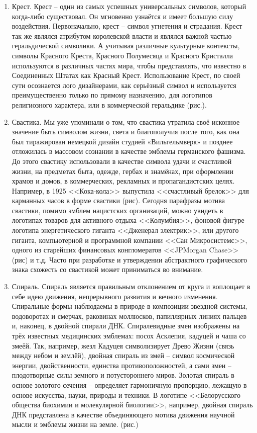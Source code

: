 \begin{enumerate}
\item Крест. Крест -- один из самых успешных универсальных символов, который
  когда-либо существовал. Он мгновенно узнаётся и  имеет большую силу
  воздействия. Первоначально, крест -- символ угнетения и страдания. Крест так
  же являлся атрибутом королевской власти и являлся важной частью
  геральдической символики. А учитывая различные культурные контексты,
  символы Красного Креста, Красного Полумесяца и Красного Кристалла
  используются в различных частях мира, чтобы представлять, что известно в
  Соединенных Штатах как Красный Крест. Использование Крест, по своей сути
  осознается лого дизайнерами, как серьёзный символ и используется
  преимущественно только по прямому назначению, для логотипов религиозного
  характера, или в коммерческой геральдике (рис.). %

\item Свастика. Мы уже упоминали о том, что свастика утратила своё исконное
  значение быть символом жизни, света и благополучия после того, как она был
  тиражирован немецкой дизайн студией «Вильгельмверк» и позднее отложилась в
  массовом сознании в качестве эмблемы германского фашизма. До этого свастику
  использовали в качестве символа удачи и счастливой жизни, на предметах быта,
  одежде, гербах и знамёнах, при оформлении храмов и домов, в коммерческих,
  рекламных и пропагандистских целях. Например, в 1925 <<Кока-кола>> выпустила
  <<счастливый брелок>> для карманных часов в форме свастики (рис). %
  Сегодня парафразы мотива свастики, помимо эмблем нацистских организаций,
  можно увидеть в логотипах товаров для активного отдыха <<Колумбия>>,
  фоновой фигуре логотипа энергетического гиганта <<Дженерал электрик>>,
  или другого гиганта, компьютерной и программной компании <<Сан Микросистемс>>,
  одного из старейших финансовых конгломератов <<JPMorgan Chase>> (рис) %
  и т.д. Часто при разработке и утверждении абстрактного графического знака
  схожесть со свастикой может приниматься во внимание.

\item Спираль. Спираль является правильным отклонением от круга и воплощает
  в себе идею движения, непрерывного развития и вечного изменения. Спиральные
  формы наблюдаемы в природе в композиции звездной системы, водоворотах и
  смерчах, раковинах моллюсков, папиллярных линиях пальцев и, наконец, в
  двойной спирали ДНК. Спиралевидные змеи изображены на трёх известных
  медицинских эмблемах: посох Асклепия, кадуцей и чаша со змеёй. Так,
  например, жезл Кадуцея символизирует Древо Жизни (связь между небом и землёй),
  двойная спираль из змей -- символ космической энергии, двойственности,
  единства противоположностей, а сами змеи -- плодотворные силы земного и
  потустороннего миров. Золотая спираль в основе золотого сечения -- определяет
  гармоничную пропорцию, лежащую в основе искусства, науки, природы и
  техники. В логотипе <<Белорусского общества биохимии и молекулярной биологии>>,
  например, двойная спираль ДНК представлена в качестве объединяющего мотива
  движения научной мысли и эмблемы жизни на земле. (рис.) %
\end{enumerate}

